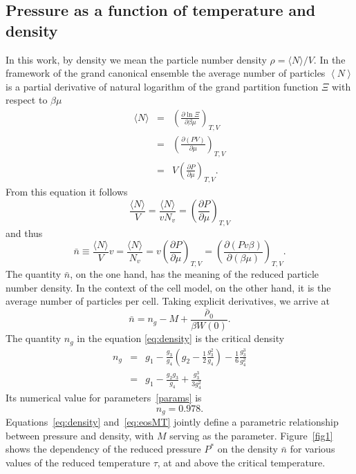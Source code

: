 \documentclass[12pt]{article}
\begin{document}
	\subsection{Pressure as a function of temperature and density}
	In this work, by density we mean the particle number density $\rho = \langle N \rangle / V$.
	In the framework of the grand canonical ensemble the average number of particles $\left\langle N \right\rangle$ is a partial derivative of natural logarithm of the grand partition function $\Xi$ with respect to $\beta \mu$ 
	\begin{eqnarray*}
		\langle N \rangle & = & \left(\frac{\partial \ln\Xi}{\partial \beta \mu}\right)_{T,V} 
		\\
		& = & \left(\frac{\partial (PV)}{\partial \mu}\right)_{T,V}
		\\
		& = & V \left(\frac{\partial P}{\partial \mu}\right)_{T,V}.
	\end{eqnarray*}
	From this equation it follows
	\begin{equation*}
		\frac{\langle N \rangle}{V} = \frac{\langle N \rangle}{v N_v} = \left(\frac{\partial P}{\partial \mu}\right)_{T,V}
	\end{equation*}
	and thus
	\begin{equation}
		\bar{n} \equiv \frac{\langle N \rangle}{V} v = \frac{\langle N \rangle}{N_v} = v \left(\frac{\partial P}{\partial \mu}\right)_{T,V} 
		= \left(\frac{\partial (Pv\beta)}{\partial (\beta \mu)}\right)_{T,V}.
	\end{equation}
	The quantity $\bar{n}$, on the one hand, has the meaning of the reduced particle number density. In the context of the cell model, on the other hand, it is the average number of particles per cell.
	Taking explicit derivatives, we arrive at
	\begin{equation}\label{eq:density}
	\bar n = n_g - M + \frac{ \bar \rho_0}{\beta W(0)}.
	\end{equation}
	The quantity $n_g$ in the equation \eqref{eq:density} is the critical density
	\begin{eqnarray}\label{eq:crit_dens}
	n_g & = & g_1 - \frac{g_3}{g_4}\left(  g_2 - \frac{1}{2} \frac{g_3^2}{g_4}\right) - \frac{1}{6} \frac{g_3^3}{g_4^2} 
	\nonumber\\
	& = & g_1 - \frac{g_2 g_3}{g_4} + \frac{g_3^3}{3g_4^2}
	\end{eqnarray}
	Its numerical value for parameters~\eqref{params} is
	\begin{equation*}
		n_g = 0.978.
	\end{equation*}
	Equations~\eqref{eq:density} and~\eqref{eq:eosMT} jointly define a parametric relationship between pressure and density, with $M$ serving as the parameter. Figure~\ref{fig1} shows the dependency of the reduced pressure $P^*$ on the density $\bar{n}$ for various values of the reduced temperature $\tau$, at and above the critical temperature.
	
\end{document}
